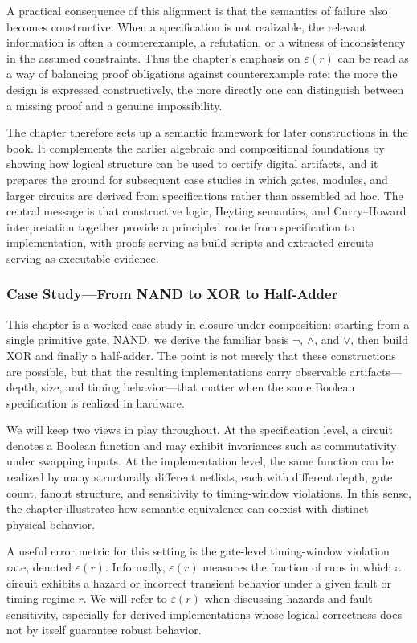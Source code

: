 \documentclass[11pt]{article}
\begin{document}
A practical consequence of this alignment is that the semantics of failure also becomes constructive. When a specification is not realizable, the relevant information is often a counterexample, a refutation, or a witness of inconsistency in the assumed constraints. Thus the chapter's emphasis on \(\varepsilon(r)\) can be read as a way of balancing proof obligations against counterexample rate: the more the design is expressed constructively, the more directly one can distinguish between a missing proof and a genuine impossibility.

The chapter therefore sets up a semantic framework for later constructions in the book. It complements the earlier algebraic and compositional foundations by showing how logical structure can be used to certify digital artifacts, and it prepares the ground for subsequent case studies in which gates, modules, and larger circuits are derived from specifications rather than assembled ad hoc. The central message is that constructive logic, Heyting semantics, and Curry--Howard interpretation together provide a principled route from specification to implementation, with proofs serving as build scripts and extracted circuits serving as executable evidence.


\subsubsection{Case Study—From NAND to XOR to Half-Adder}

This chapter is a worked case study in closure under composition: starting from a single primitive gate, NAND, we derive the familiar basis \(\neg\), \(\wedge\), and \(\vee\), then build XOR and finally a half-adder. The point is not merely that these constructions are possible, but that the resulting implementations carry observable artifacts---depth, size, and timing behavior---that matter when the same Boolean specification is realized in hardware.

We will keep two views in play throughout. At the specification level, a circuit denotes a Boolean function and may exhibit invariances such as commutativity under swapping inputs. At the implementation level, the same function can be realized by many structurally different netlists, each with different depth, gate count, fanout structure, and sensitivity to timing-window violations. In this sense, the chapter illustrates how semantic equivalence can coexist with distinct physical behavior.

A useful error metric for this setting is the gate-level timing-window violation rate, denoted \(\varepsilon(r)\). Informally, \(\varepsilon(r)\) measures the fraction of runs in which a circuit exhibits a hazard or incorrect transient behavior under a given fault or timing regime \(r\). We will refer to \(\varepsilon(r)\) when discussing hazards and fault sensitivity, especially for derived implementations whose logical correctness does not by itself guarantee robust behavior.
\end{document}

